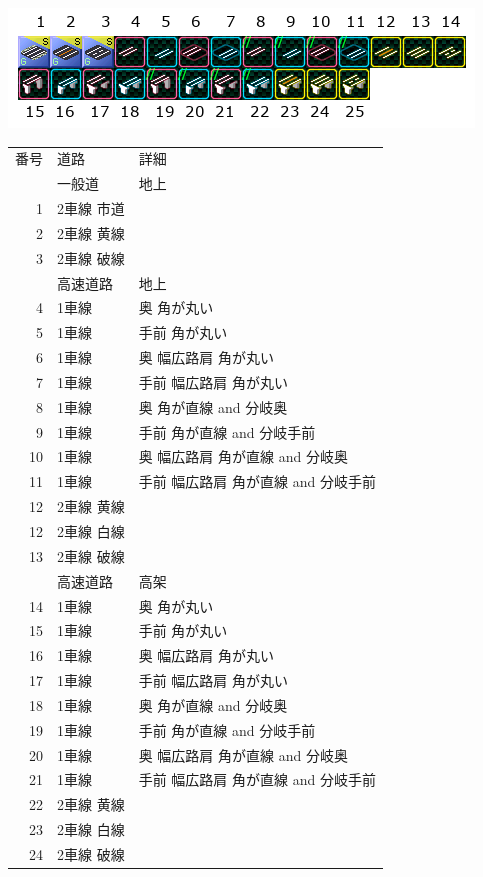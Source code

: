 \documentclass{jarticle}
\begin{document}
\begin{flushleft}
  \includegraphics{picture/menu-1-1.png}
\end{flushleft}
\begin{tabular}{rll}
  番号 & 道路 & 詳細 \\
  & 一般道 & 地上 \\
  1 & 2車線 市道 & \\
  2 & 2車線 黄線  & \\
  3 & 2車線 破線 & \\
  & 高速道路 & 地上 \\
  4 & 1車線 & 奥 角が丸い \\
  5 & 1車線 & 手前 角が丸い \\
  6 & 1車線 & 奥 幅広路肩 角が丸い \\
  7 & 1車線 & 手前 幅広路肩 角が丸い \\
  8 & 1車線 & 奥 角が直線 and 分岐奥\\
  9 & 1車線 & 手前 角が直線 and 分岐手前\\
  10 & 1車線 & 奥 幅広路肩 角が直線  and 分岐奥\\
  11 & 1車線 & 手前 幅広路肩 角が直線 and 分岐手前\\
  12 & 2車線 黄線 & \\
  12 & 2車線 白線 & \\
  13 & 2車線 破線 & \\
  & 高速道路 & 高架 \\
  14 & 1車線 & 奥 角が丸い \\
  15 & 1車線 & 手前 角が丸い \\
  16 & 1車線 & 奥 幅広路肩 角が丸い \\
  17 & 1車線 & 手前 幅広路肩 角が丸い \\
  18 & 1車線 & 奥 角が直線 and 分岐奥\\
  19 & 1車線 & 手前 角が直線 and 分岐手前\\
  20 & 1車線 & 奥 幅広路肩 角が直線 and 分岐奥 \\
  21 & 1車線 & 手前 幅広路肩 角が直線 and 分岐手前\\
  22 & 2車線 黄線 & \\
  23 & 2車線 白線 & \\
  24 & 2車線 破線 & \\
\end{tabular}
\end{document}
